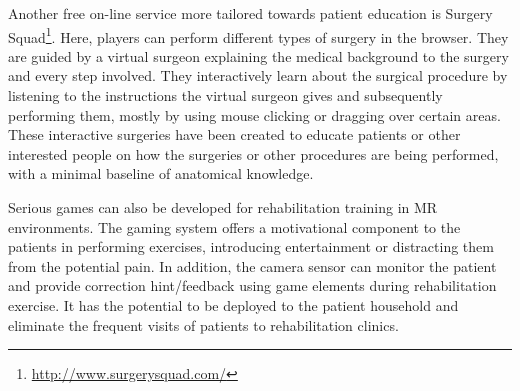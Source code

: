 Another free on-line service more tailored towards patient education is Surgery Squad\footnote{\url{http://www.surgerysquad.com/}}. Here, players can perform different types of surgery in the browser. They are guided by a virtual surgeon explaining the medical background to the surgery and every step involved. They interactively learn about the surgical procedure by listening to the instructions the virtual surgeon gives and subsequently performing them, mostly by using mouse clicking or dragging over certain areas. These interactive surgeries have been created to educate patients or other interested people on how the surgeries or other procedures are being performed, with a minimal baseline of anatomical knowledge.

Serious games can also be developed for rehabilitation training in MR environments. The gaming system offers a motivational component to the patients in performing exercises, introducing entertainment or distracting them from the potential pain. 
In addition, the camera sensor can monitor the patient and provide correction hint/feedback using game elements during rehabilitation exercise. It has the potential to be deployed to the patient household and eliminate the frequent visits of patients to rehabilitation clinics.

